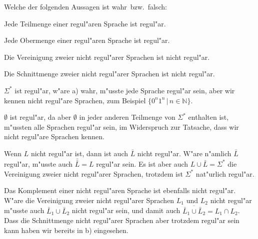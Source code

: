 Welche der folgenden Aussagen ist wahr~bzw.~falsch:
\begin{teilaufgaben}
\item Jede Teilmenge einer regul"aren Sprache ist regul"ar.
\item Jede Obermenge einer regul"aren Sprache ist regul"ar.
\item Die Vereinigung zweier nicht regul"arer Sprachen ist nicht regul"ar.
\item Die Schnittmenge zweier nicht regul"arer Sprachen ist nicht
regul"ar.
\end{teilaufgaben}

\begin{loesung}
\begin{teilaufgaben}
\item $\Sigma^*$ ist regul"ar, w"are a) wahr, m"usste jede Sprache regul"ar
sein, aber wir kennen nicht regul"are Sprachen, zum Beispiel
$\{0^n1^n\,|\,n\in\mathbb N\}$.
\item $\emptyset$ ist regul"ar, da aber $\emptyset$ in jeder anderen
Teilmenge von $\Sigma^*$ enthalten ist, m"ussten alle Sprachen regul"ar
sein, im Widerspruch zur Tatsache, dass wir nicht regul"are Sprachen
kennen.
\item Wenn $L$ nicht regul"ar ist, dann ist auch $\bar L$ nicht regul"ar.
W"are n"amlich $\bar L$ regul"ar, m"usste auch $\bar{\bar L}=L$ regul"ar
sein. Es ist aber auch $L\cup \bar L=\Sigma^*$ die Vereinigung zweier
nicht regul"arer Sprachen, trotzdem ist $\Sigma^*$ nat"urlich regul"ar.
\item Das Komplement einer nicht regul"aren Sprache ist ebenfalls nicht
regul"ar. W"are die Vereinigung zweier nicht regul"arer Sprachen $L_1$
und $L_2$ nicht regul"ar m"usste auch $\bar L_1\cup \bar L_2$ nicht
regul"ar sein, und damit auch $\overline{\bar L_1\cup \bar L_2}=L_1\cap L_2$.
Dass die Schnittmenge nicht regul"arer Sprachen aber trotzdem regul"ar
sein kann haben wir bereits in b) eingesehen.
\end{teilaufgaben}
\end{loesung}
